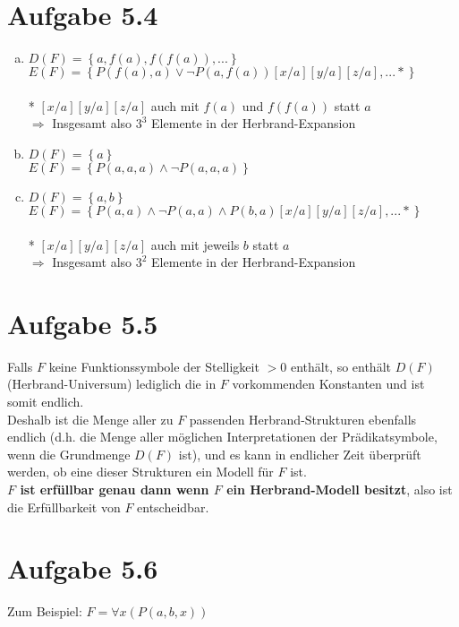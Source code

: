 \documentclass[a4paper,12pt]{article}
\begin{document}
	\section*{Aufgabe 5.4}
	\begin{enumerate}[a)]
		\item $D \left(F\right) = \left\lbrace a, f\left(a\right), f\left(f\left(a\right)\right),...\right\rbrace$\\
		$E\left(F\right) = \left\lbrace P\left(f\left(a\right), a\right) \vee \lnot P \left(a, f\left(a\right)\right) \left[x/a\right] \left[y/a\right] \left[z/a\right],... *\right\rbrace$\\
		\\
		\hspace*{3cm} * $\left[x/a\right] \left[y/a\right] \left[z/a\right]$ auch mit $f\left(a\right)$ und $ f\left(f\left(a\right)\right)$ statt $a$\\
		\hspace*{3cm} $\Rightarrow$ Insgesamt also $3^3$ Elemente in der Herbrand-Expansion
		\item $D \left(F\right) = \left\lbrace a\right\rbrace$\\
		$E\left(F\right) = \left\lbrace P\left(a,a,a\right) \wedge \lnot P \left(a,a,a\right) \right\rbrace$
		\item $D \left(F\right) = \left\lbrace a,b\right\rbrace$\\
		$E\left(F\right) = \left\lbrace P\left(a,a\right) \wedge \lnot P \left(a,a\right) \wedge P \left(b,a\right) \left[x/a\right] \left[y/a\right] \left[z/a\right],...*\right\rbrace$\\
		\\
		\hspace*{3cm} * $\left[x/a\right] \left[y/a\right] \left[z/a\right]$ auch mit jeweils $b$ statt $a$\\
		\hspace*{3cm} $\Rightarrow$ Insgesamt also $3^2$ Elemente in der Herbrand-Expansion
	\end{enumerate}

	\section*{Aufgabe 5.5}
	Falls $F$ keine Funktionssymbole der Stelligkeit $> 0$ enthält, so enthält $D \left(F\right)$ (Herbrand-Universum) lediglich die in $F$ vorkommenden Konstanten und ist somit endlich.\\
	Deshalb ist die Menge aller zu $F$ passenden Herbrand-Strukturen ebenfalls endlich (d.h. die Menge aller möglichen Interpretationen der Prädikatsymbole, wenn die Grundmenge $D\left(F\right)$ ist), und es kann in endlicher Zeit überprüft werden, ob eine dieser Strukturen ein Modell für $F$ ist.\\
	
	\textbf{$F$ ist erfüllbar genau dann wenn $F$ ein Herbrand-Modell besitzt}, also ist die Erfüllbarkeit von $F$ entscheidbar.\\

	
	\section*{Aufgabe 5.6}
	Zum Beispiel: \hspace*{0.5cm} $F = \forall x \left(P \left(a,b,x\right)\right)$
\end{document}

